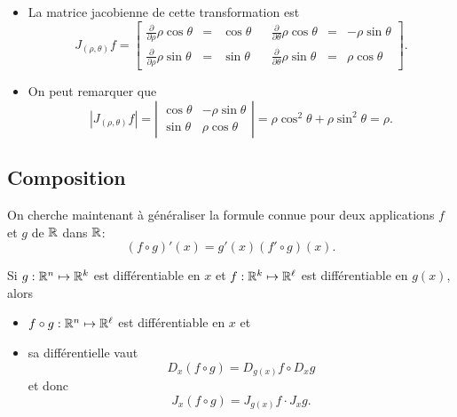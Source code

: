 \remarks
\begin{itemize}
  \item La matrice jacobienne de cette transformation est
  $$
  J_{(\rho, \theta)}f = \left[ \begin{array}{rclcrcl}
      \frac{\partial}{\partial \rho} \rho \cos \theta & = & \cos \theta  & &
      \frac{\partial}{\partial \theta} \rho \cos \theta & = & -\rho \sin \theta  \\
      \frac{\partial}{\partial \rho} \rho \sin \theta & = & \sin \theta  & & 
      \frac{\partial}{\partial \theta} \rho \sin \theta & = & \rho \cos \theta  
    \end{array} \right].
  $$
  \item On peut remarquer que
  $$
  |J_{(\rho, \theta)}f| 
  = \left| \begin{array}{cc}
      \cos \theta  & -\rho \sin \theta  \\
      \sin \theta  & \rho \cos \theta  
    \end{array} \right|
  = \rho \cos^2\theta + \rho \sin^2 \theta = \rho.
  $$
\end{itemize}


\subsection{Composition} 

On cherche maintenant à généraliser la formule connue pour deux applications $f$ et $g$ de $\mathbb{R}$ dans $\mathbb{R}$:
$$
(f \circ g)'(x) = g'(x) (f' \circ g)(x).
$$

\begin{proposition} \label{prop:compositionDifferentielles}
  Si $g : \mathbb{R}^n \mapsto \mathbb{R}^k$ est différentiable en $x$ et $f : \mathbb{R}^k \mapsto \mathbb{R}^\ell$ est différentiable en $g(x)$, alors
  \begin{itemize}
   \item $f \circ g: \mathbb{R}^n \mapsto \mathbb{R}^\ell$ est différentiable en $x$ et
   \item sa différentielle vaut
   $$
   D_x(f \circ g) = D_{g(x)}f \circ D_xg
   $$
   et donc
   $$
   J_x(f \circ g) = J_{g(x)}f \cdot J_xg.
   $$
  \end{itemize}
\end{proposition}

